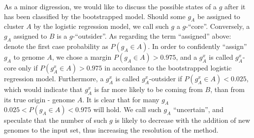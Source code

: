As a minor digression, we would like to discuss the possible states of a $g$
after it has been classified by the bootstrapped model. Should some $g_A$ be
assigned to cluster $A$ by the logistic regression model, we call such $g$
a $g$-``core''. Conversely, a $g_A$ assigned to $B$ is a $g$-``outsider''. As
regarding the term ``assigned'' above: denote the first case probability as $P(g_A \in
A)$. In order to confidently ``assign'' $g_A$ to genome $A$, we chose a margin
$P(g_A \in A) >0.975$, and a $g_A^x$ is called $g_A^x$-core only if $P(g_A^x
\in A) > 0.975$ in accordance to the bootstrapped logistic regression model.
Furthermore, a $g_A^x$ is called $g_A^x$-outsider if $P(g_A^x \in A) < 0.025$,
which would indicate that $g_A^x$ is far more likely to be coming from $B$,
than from its true origin - genome $A$. It is clear that for many $g_A$ $0.025
< P(g_A \in A) < 0.975$ will hold. We call such $g_A$ ``uncertain'', and
speculate that the number of such $g$ is likely to decrease with the addition
of new genomes to the input set, thus increasing the resolution of the method.
